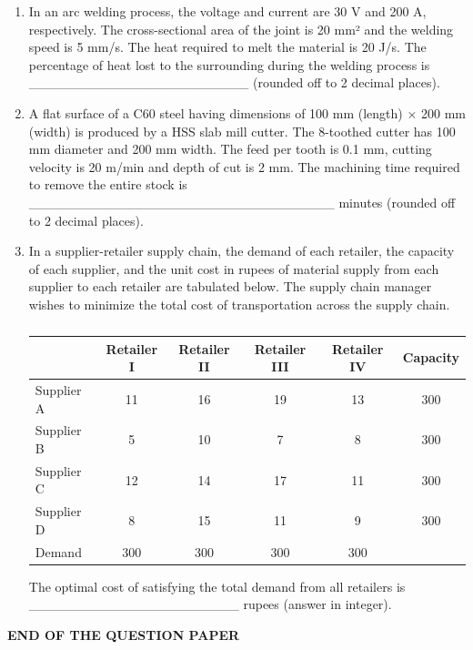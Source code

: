\documentclass[journal,11pt,onecolumn]{IEEEtran}
\begin{document}
\begin{enumerate}[resume]
    \item In an arc welding process, the voltage and current are 30 V and 200 A, respectively. The cross-sectional area of the joint is 20 mm² and the welding speed is 5 mm/s. The heat required to melt the material is 20 J/s. The percentage of heat lost to the surrounding during the welding process is \_\_\_\_\_\_\_\_\_\_\_\_\_\_\_\_\_\_\_\_\_\_\_ (rounded off to 2 decimal places).

    \item A flat surface of a C60 steel having dimensions of 100 mm (length) × 200 mm (width) is produced by a HSS slab mill cutter. The 8-toothed cutter has 100 mm diameter and 200 mm width. The feed per tooth is 0.1 mm, cutting velocity is 20 m/min and depth of cut is 2 mm. The machining time required to remove the entire stock is \_\_\_\_\_\_\_\_\_\_\_\_\_\_\_\_\_\_\_\_\_\_\_\_\_\_\_\_\_\_\_\_ minutes (rounded off to 2 decimal places).

    \item In a supplier-retailer supply chain, the demand of each retailer, the capacity of each supplier, and the unit cost in rupees of material supply from each supplier to each retailer are tabulated below. The supply chain manager wishes to minimize the total cost of transportation across the supply chain.

          \begin{table}[H]
              \centering
              \begin{tabular}{|l|c|c|c|c|c|}
                  \hline
                             & Retailer I & Retailer II & Retailer III & Retailer IV & Capacity \\
                  \hline
                  Supplier A & 11         & 16          & 19           & 13          & 300      \\
                  \hline
                  Supplier B & 5          & 10          & 7            & 8           & 300      \\
                  \hline
                  Supplier C & 12         & 14          & 17           & 11          & 300      \\
                  \hline
                  Supplier D & 8          & 15          & 11           & 9           & 300      \\
                  \hline
                  Demand     & 300        & 300         & 300          & 300         &          \\
                  \hline
              \end{tabular}
              \caption{}
              \label{t65}
          \end{table}

          The optimal cost of satisfying the total demand from all retailers is \_\_\_\_\_\_\_\_\_\_\_\_\_\_\_\_\_\_\_\_\_\_ rupees (answer in integer).

\end{enumerate}

\centering\Large\textbf{END OF THE QUESTION PAPER}
\end{document}

